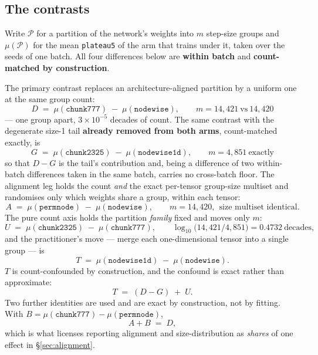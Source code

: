 \documentclass[10pt,letterpaper]{article}
\newcommand{\Dstat}{D}                         %
\newcommand{\Gstat}{G}                         %
\newcommand{\Astat}{A}                         %
\newcommand{\Tstat}{T}                         %
\newcommand{\Ustat}{U}                         %
\newcommand{\plateau}{\texttt{plateau5}}
\newcommand{\arm}[1]{\texttt{#1}}
\begin{document}
\subsection{The contrasts}
\label{sec:contrasts}

Write $\mathcal{P}$ for a partition of the network's weights into $m$ step-size groups and
$\mu(\mathcal{P})$ for the mean \plateau{} of the arm that trains under it, taken over the seeds
of one batch. All four differences below are \textbf{within batch} and \textbf{count-matched by
construction}.

The primary contrast replaces an architecture-aligned partition by a uniform one at the same
group count:
\begin{equation}
\Dstat \;=\; \mu(\arm{chunk777}) \;-\; \mu(\arm{nodewise}),
\qquad m = 14{,}421 \ \text{vs}\ 14{,}420
\label{eq:D}
\end{equation}
--- one group apart, $3\times10^{-5}$ decades of count. The same contrast with the degenerate
size-1 tail \textbf{already removed from both arms}, count-matched exactly, is
\begin{equation}
\Gstat \;=\; \mu(\arm{chunk2325}) \;-\; \mu(\arm{nodewise1d}),
\qquad m = 4{,}851 \ \text{exactly}
\label{eq:G}
\end{equation}
so that $\Dstat - \Gstat$ is the tail's contribution and, being a difference of two
within-batch differences taken in the same batch, carries no cross-batch floor. The alignment
leg holds the count \emph{and} the exact per-tensor group-size multiset and randomises only
which weights share a group, within each tensor:
\begin{equation}
\Astat \;=\; \mu(\arm{permnode}) \;-\; \mu(\arm{nodewise}),
\qquad m = 14{,}420,\ \ \text{size multiset identical}.
\label{eq:A}
\end{equation}
The pure count axis holds the partition \emph{family} fixed and moves only $m$:
\begin{equation}
\Ustat \;=\; \mu(\arm{chunk2325}) \;-\; \mu(\arm{chunk777}),
\qquad \log_{10}\!\big(14{,}421/4{,}851\big) = 0.4732\ \text{decades},
\label{eq:U}
\end{equation}
and the practitioner's move --- merge each one-dimensional tensor into a single group --- is
\begin{equation}
\Tstat \;=\; \mu(\arm{nodewise1d}) \;-\; \mu(\arm{nodewise}).
\label{eq:T}
\end{equation}
$\Tstat$ is count-confounded by construction, and the confound is exact rather than
approximate:
\begin{equation}
\Tstat \;=\; (\Dstat - \Gstat) \;+\; \Ustat .
\label{eq:Tid}
\end{equation}
Two further identities are used and are exact by construction, not by fitting. With
$B = \mu(\arm{chunk777}) - \mu(\arm{permnode})$,
\begin{equation}
\Astat + B \;=\; \Dstat ,
\label{eq:AB}
\end{equation}
which is what licenses reporting alignment and size-distribution as \emph{shares} of one effect
in \S\ref{sec:alignment}.
\end{document}
